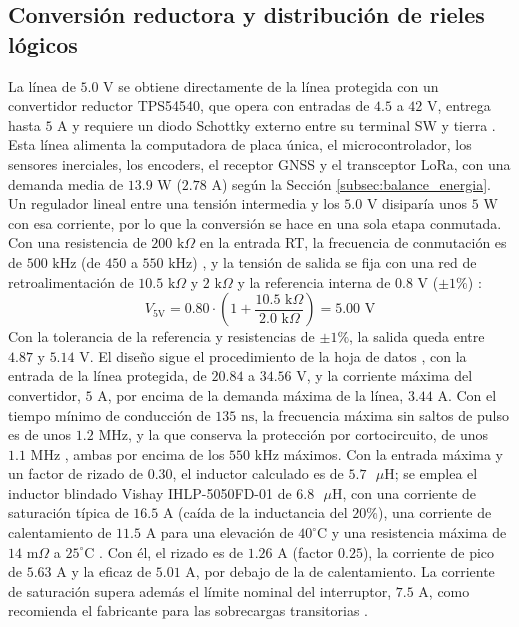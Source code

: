 \documentclass[../../General.tex]{subfiles}
\begin{document}
\subsection{Conversión reductora y distribución de rieles lógicos}

La línea de $5.0\text{ V}$ se obtiene directamente de la línea protegida con un convertidor reductor TPS54540, que opera con entradas de $4.5$ a $42\text{ V}$, entrega hasta $5\text{ A}$ y requiere un diodo Schottky externo entre su terminal SW y tierra \citep{ti_tps54540}.
Esta línea alimenta la computadora de placa única, el microcontrolador, los sensores inerciales, los encoders, el receptor GNSS y el transceptor LoRa, con una demanda media de $13.9\text{ W}$ ($2.78\text{ A}$) según la Sección \ref{subsec:balance_energia}. Un regulador lineal entre una tensión intermedia y los $5.0\text{ V}$ disiparía unos $5\text{ W}$ con esa corriente, por lo que la conversión se hace en una sola etapa conmutada. Con una resistencia de $200\text{ k}\Omega$ en la entrada RT, la frecuencia de conmutación es de $500\text{ kHz}$ (de $450$ a $550\text{ kHz}$) \citep{ti_tps54540}, y la tensión de salida se fija con una red de retroalimentación de $10.5\text{ k}\Omega$ y $2\text{ k}\Omega$ y la referencia interna de $0.8\text{ V}$ ($\pm 1\%$) \citep{ti_tps54540}:
\begin{equation}
V_{5\text{V}} = 0.80 \cdot \left(1 + \frac{10.5\text{ k}\Omega}{2.0\text{ k}\Omega}\right) = 5.00\text{ V}
\end{equation}
Con la tolerancia de la referencia y resistencias de $\pm 1\%$, la salida queda entre $4.87$ y $5.14\text{ V}$. El diseño sigue el procedimiento de la hoja de datos \citep{ti_tps54540}, con la entrada de la línea protegida, de $20.84$ a $34.56\text{ V}$, y la corriente máxima del convertidor, $5\text{ A}$, por encima de la demanda máxima de la línea, $3.44\text{ A}$. Con el tiempo mínimo de conducción de $135\text{ ns}$, la frecuencia máxima sin saltos de pulso es de unos $1.2\text{ MHz}$, y la que conserva la protección por cortocircuito, de unos $1.1\text{ MHz}$ \citep{ti_tps54540}, ambas por encima de los $550\text{ kHz}$ máximos. Con la entrada máxima y un factor de rizado de $0.30$, el inductor calculado es de $5.7\text{ }\mu\text{H}$; se emplea el inductor blindado Vishay IHLP-5050FD-01 de $6.8\text{ }\mu\text{H}$, con una corriente de saturación típica de $16.5\text{ A}$ (caída de la inductancia del $20\%$), una corriente de calentamiento de $11.5\text{ A}$ para una elevación de $40^\circ\text{C}$ y una resistencia máxima de $14\text{ m}\Omega$ a $25^\circ\text{C}$ \citep{vishay_ihlp5050fd}. Con él, el rizado es de $1.26\text{ A}$ (factor $0.25$), la corriente de pico de $5.63\text{ A}$ y la eficaz de $5.01\text{ A}$, por debajo de la de calentamiento. La corriente de saturación supera además el límite nominal del interruptor, $7.5\text{ A}$, como recomienda el fabricante para las sobrecargas transitorias \citep{ti_tps54540}.
\end{document}
